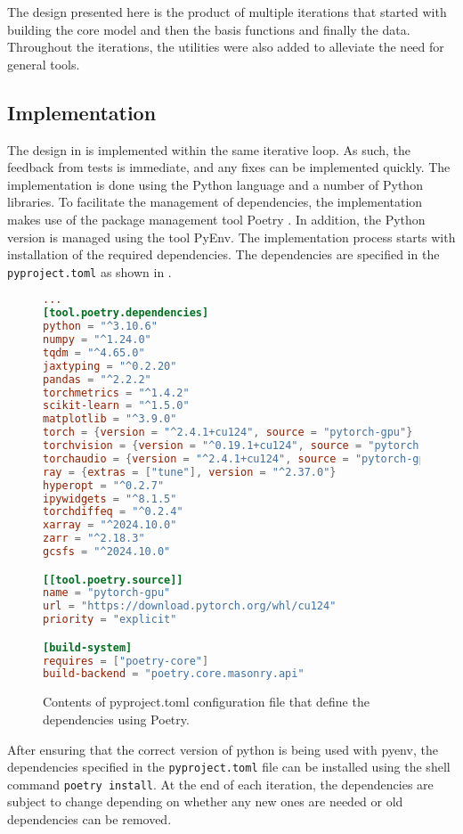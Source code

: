 The design presented here is the product of multiple iterations that started with building the core model and then the basis functions and finally the data. Throughout the iterations, the utilities were also added to alleviate the need for general tools.

\subsection{Implementation}

\noindent The design in  is implemented within the same iterative loop. As such, the feedback from tests is immediate, and any fixes can be implemented quickly. The implementation is done using the Python language and a number of Python libraries. To facilitate the management of dependencies, the implementation makes use of the package management tool Poetry \autocite{eustacePoetryPythonPackaging2024}. In addition, the Python version is managed using the tool PyEnv. The implementation process starts with installation of the required dependencies. The dependencies are specified in the \verb|pyproject.toml| as shown in .

\begin{figure}[H]
  \centering
  \begin{lstlisting}[language=Toml]
...
[tool.poetry.dependencies]
python = "^3.10.6"
numpy = "^1.24.0"
tqdm = "^4.65.0"
jaxtyping = "^0.2.20"
pandas = "^2.2.2"
torchmetrics = "^1.4.2"
scikit-learn = "^1.5.0"
matplotlib = "^3.9.0"
torch = {version = "^2.4.1+cu124", source = "pytorch-gpu"}
torchvision = {version = "^0.19.1+cu124", source = "pytorch-gpu"}
torchaudio = {version = "^2.4.1+cu124", source = "pytorch-gpu"}
ray = {extras = ["tune"], version = "^2.37.0"}
hyperopt = "^0.2.7"
ipywidgets = "^8.1.5"
torchdiffeq = "^0.2.4"
xarray = "^2024.10.0"
zarr = "^2.18.3"
gcsfs = "^2024.10.0"

[[tool.poetry.source]]
name = "pytorch-gpu"
url = "https://download.pytorch.org/whl/cu124"
priority = "explicit"

[build-system]
requires = ["poetry-core"]
build-backend = "poetry.core.masonry.api"
  \end{lstlisting}
  \caption{Contents of pyproject.toml configuration file that define the dependencies using Poetry.}\label{fig:poetry_add_deps}
\end{figure}

After ensuring that the correct version of python is being used with pyenv, the dependencies specified in the \verb|pyproject.toml| file can be installed using the shell command \verb|poetry install|. At the end of each iteration, the dependencies are subject to change depending on whether any new ones are needed or old dependencies can be removed.

